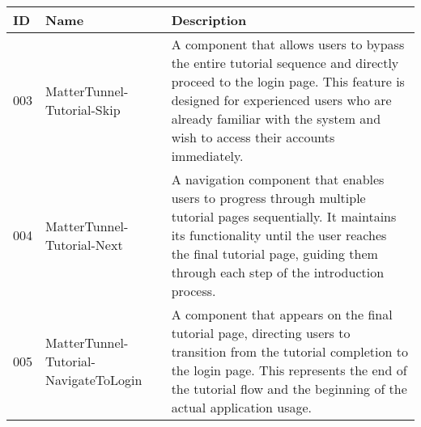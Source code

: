 \documentclass[conference]{IEEEtran}
\begin{document}
\begin{enumerate}[itemsep=2ex, parsep=1ex]
	      \begin{table}[h!]
	      	\def\arraystretch{1.24} \small
	      	\begin{tabular}{|p{1.2cm}|p{2.5cm}|p{4.0cm}|}
	      		\hline
	      		ID  & Name                                  & Description                                                                                                                                                                                                                                         \\
	      		\hline
	      		003 & MatterTunnel-Tutorial-Skip            & A component that allows users to bypass the entire tutorial sequence and directly proceed to the login page. This feature is designed for experienced users who are already familiar with the system and wish to access their accounts immediately. \\
	      		\hline
	      		004 & MatterTunnel-Tutorial-Next            & A navigation component that enables users to progress through multiple tutorial pages sequentially. It maintains its functionality until the user reaches the final tutorial page, guiding them through each step of the introduction process.      \\
	      		\hline
	      		005 & MatterTunnel-Tutorial-NavigateToLogin & A component that appears on the final tutorial page, directing users to transition from the tutorial completion to the login page. This represents the end of the tutorial flow and the beginning of the actual application usage.                  \\
	      		\hline
	      	\end{tabular}
	      \end{table}
	      
	      \vspace{5cm}
	      

\end{enumerate}
\end{document}
